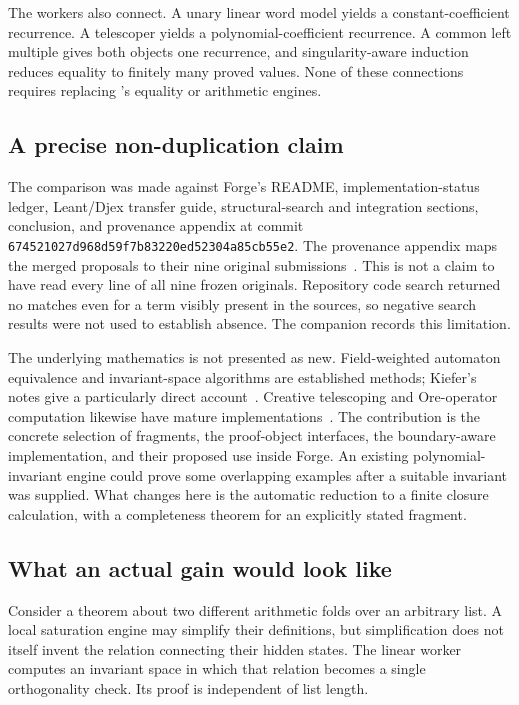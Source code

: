 The workers also connect. A unary linear word model yields a constant-coefficient
recurrence. A telescoper yields a polynomial-coefficient recurrence. A common
left multiple gives both objects one recurrence, and singularity-aware induction
reduces equality to finitely many proved values. None of these connections
requires replacing \grind{}'s equality or arithmetic engines.

\subsection{A precise non-duplication claim}

The comparison was made against Forge's README, implementation-status ledger,
Leant/Djex transfer guide, structural-search and integration sections,
conclusion, and provenance appendix at commit
\texttt{674521027d968d59f7b83220ed52304a85cb55e2}. The provenance appendix maps the
merged proposals to their nine original submissions~\cite{forge-provenance}.
This is not a claim to have read every line of all nine frozen originals.
Repository code search returned no matches even for a term visibly present in
the sources, so negative search results were not used to establish absence.
The companion  records this limitation.

The underlying mathematics is not presented as new. Field-weighted automaton
equivalence and invariant-space algorithms are established methods; Kiefer's
notes give a particularly direct account~\cite{kiefer}. Creative telescoping
and Ore-operator computation likewise have mature implementations~\cite{holonomic,ore}.
The contribution is the concrete selection of fragments, the proof-object
interfaces, the boundary-aware implementation, and their proposed use inside
Forge. An existing polynomial-invariant engine could prove some overlapping
examples after a suitable invariant was supplied. What changes here is the
automatic reduction to a finite closure calculation, with a completeness theorem
for an explicitly stated fragment.

\subsection{What an actual gain would look like}

Consider a theorem about two different arithmetic folds over an arbitrary list.
A local saturation engine may simplify their definitions, but simplification
does not itself invent the relation connecting their hidden states. The linear
worker computes an invariant space in which that relation becomes a single
orthogonality check. Its proof is independent of list length.

